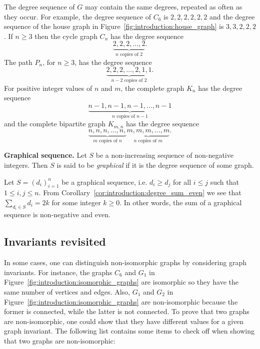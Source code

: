 The degree sequence of $G$ may contain the same degrees, repeated as
often as they occur. For example, the degree sequence of $C_6$ is
$2, 2, 2, 2, 2, 2$ and the degree sequence of the house graph in
Figure~\ref{fig:introduction:house_graph} is $3, 3, 2, 2, 2$. If
$n \geq 3$ then the cycle graph $C_n$ has the degree sequence
\[
\underbrace{2, 2, 2, \dots, 2}_{n \text{ copies of } 2}.
\]
The path $P_n$, for $n \geq 3$, has the degree sequence
\[
\underbrace{2, 2, 2, \dots, 2, 1, 1}_{n - 2 \text{ copies of } 2}.
\]
For positive integer values of $n$ and $m$, the complete graph $K_n$
has the degree sequence
\[
\underbrace{n-1, n-1, n-1, \dots, n-1}_{n \text{ copies of } n-1}
\]
and the complete bipartite graph $K_{m,n}$ has the degree sequence
\[
\underbrace{n, n, n, \dots, n,}_{m \text{ copies of } n}
\underbrace{m, m, m, \dots, m}_{n \text{ copies of } m}.
\]

\begin{definition}
\textbf{Graphical sequence.}
Let $S$ be a non-increasing sequence of non-negative integers. Then
$S$ is said to be \emph{graphical} if it is the degree sequence of
some graph.
\end{definition}



Let $S = (d_i)_{i=1}^{n}$ be a graphical sequence, i.e. $d_i \geq d_j$
for all $i \leq j$ such that $1 \leq i, j \leq n$. From
Corollary~\ref{cor:introduction:degree_sum_even} we see that
$\sum_{d_i \in S} d_i = 2k$ for some integer $k \geq 0$. In other
words, the sum of a graphical sequence is non-negative and
even.



\subsection{Invariants revisited}

In some cases, one can distinguish non-isomorphic graphs by
considering graph invariants. For instance, the graphs $C_6$ and $G_1$
in Figure~\ref{fig:introduction:isomorphic_graphs} are isomorphic so
they have the same number of vertices and edges. Also, $G_1$ and $G_2$
in Figure~\ref{fig:introduction:isomorphic_graphs}  are non-isomorphic
because the former is connected, while the latter is not connected. To
prove that two graphs are non-isomorphic, one could show that they
have different values for a given graph invariant. The following list
contains some items to check off when showing that two graphs are
non-isomorphic:

